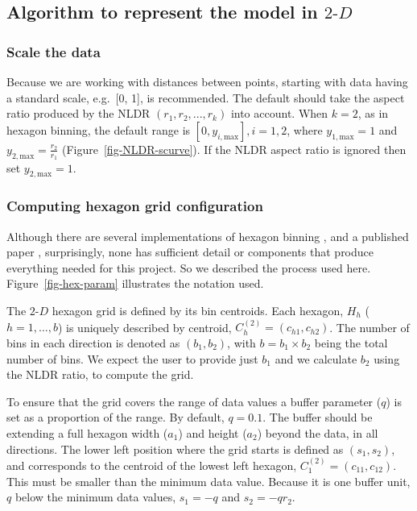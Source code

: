 \documentclass[
  12pt]{article}
\newcommand\gD{$2\text{-}D$}
\begin{document}
\subsection{\texorpdfstring{Algorithm to represent the model in
\gD{}}{Algorithm to represent the model in }}\label{algorithm-to-represent-the-model-in}

\subsubsection{Scale the data}\label{scale-the-data}

Because we are working with distances between points, starting with data
having a standard scale, e.g.~{[}0, 1{]}, is recommended. The default
should take the aspect ratio produced by the NLDR
\((r_1, r_2, ..., r_k)\) into account. When \(k=2\), as in hexagon
binning, the default range is \([0, y_{i,\text{max}}], i=1,2\), where
\(y_{1,\text{max}}=1\) and \(y_{2,\text{max}} = \frac{r_2}{r_1}\)
(Figure~\ref{fig-NLDR-scurve}). If the NLDR aspect ratio is ignored then
set \(y_ {2,\text{max}} = 1\).

\subsubsection{Computing hexagon grid
configuration}\label{computing-hexagon-grid-configuration}

Although there are several implementations of hexagon binning
\citep{carr1987}, and a published paper \citep{dan2023}, surprisingly,
none has sufficient detail or components that produce everything needed
for this project. So we described the process used here.
Figure~\ref{fig-hex-param} illustrates the notation used.

The \gD{} hexagon grid is defined by its bin centroids. Each hexagon,
\(H_h\) (\(h = 1, \dots, b\)) is uniquely described by centroid,
\(C_{h}^{(2)} = (c_{h1}, c_{h2})\). The number of bins in each direction
is denoted as \((b_1, b_2)\), with \(b = b_1 \times b_2\) being the
total number of bins. We expect the user to provide just \(b_1\) and we
calculate \(b_2\) using the NLDR ratio, to compute the grid.

To ensure that the grid covers the range of data values a buffer
parameter (\(q\)) is set as a proportion of the range. By default,
\(q=0.1\). The buffer should be extending a full hexagon width (\(a_1\))
and height (\(a_2\)) beyond the data, in all directions. The lower left
position where the grid starts is defined as \((s_1, s_2)\), and
corresponds to the centroid of the lowest left hexagon,
\(C_{1}^{(2)} = (c_{11}, c_{12})\). This must be smaller than the
minimum data value. Because it is one buffer unit, \(q\) below the
minimum data values, \(s_1 = -q\) and \(s_2 = -qr_2\).
\end{document}
